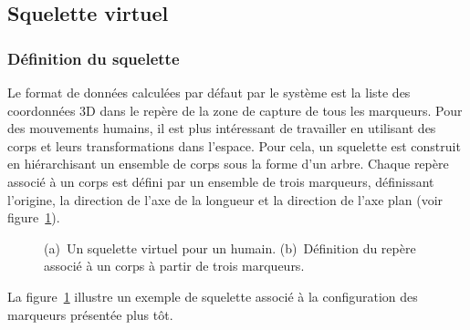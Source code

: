 \subsection{Squelette virtuel}
\subsubsection{Définition du squelette}
Le format de données calculées par défaut par le système est la liste des 
coordonnées 3D dans le repère de la zone de capture
de tous les marqueurs. Pour des mouvements humains,
il est plus intéressant de travailler en utilisant des corps et leurs transformations
dans l'espace. Pour cela, un squelette est construit en hiérarchisant un ensemble
de corps sous la forme d'un arbre. Chaque repère associé à un corps est défini par un ensemble de trois marqueurs,
définissant l'origine, la direction de l'axe de la longueur et la direction de l'axe 
plan (voir figure~\ref{fig:bone}).
\begin{figure}[p]
  \begin{center}
    \hspace{50px}
  \end{center}
  \caption[Squelette virtuel.]{(a)~Un squelette virtuel pour un humain. (b)~Définition du repère associé à un corps à partir de trois marqueurs.}
  \label{fig:bone}
\end{figure}
La figure~\ref{fig:bone} illustre un exemple de squelette associé à la configuration
des marqueurs présentée plus tôt.

